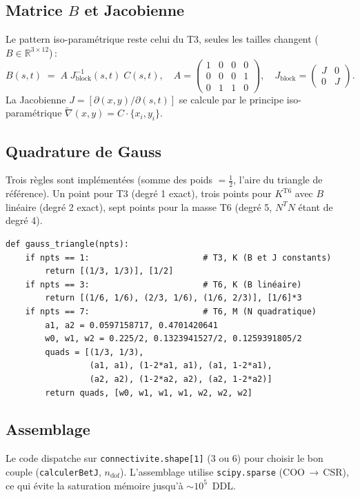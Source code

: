 \documentclass[a4paper,10pt]{article}
\begin{document}
\subsection{Matrice $B$ et Jacobienne}
Le pattern iso-paramétrique reste celui du T3, seules les tailles
changent ($B\in\mathbb{R}^{3\times 12}$)\,:
\begin{equation}
B(s,t) \;=\; A\;J_\text{block}^{-1}(s,t)\;C(s,t),
\quad
A = \begin{pmatrix} 1&0&0&0\\0&0&0&1\\0&1&1&0\end{pmatrix},
\quad
J_\text{block} = \begin{pmatrix} J&0\\0&J\end{pmatrix}.
\end{equation}
La Jacobienne $J=[\partial(x,y)/\partial(s,t)]$ se calcule par le
principe iso-paramétrique $\tilde\nabla(x,y) = C\cdot\{x_i,y_i\}$.

\subsection{Quadrature de Gauss}
Trois règles sont implémentées (somme des poids $= \tfrac12$,
l'aire du triangle de référence). Un point pour T3 (degré 1 exact),
trois points pour $K^\text{T6}$ avec $B$ linéaire (degré 2 exact),
sept points pour la masse T6 (degré 5, $N^TN$ étant de degré 4).

\begin{verbatim}
def gauss_triangle(npts):
    if npts == 1:                       # T3, K (B et J constants)
        return [(1/3, 1/3)], [1/2]
    if npts == 3:                       # T6, K (B linéaire)
        return [(1/6, 1/6), (2/3, 1/6), (1/6, 2/3)], [1/6]*3
    if npts == 7:                       # T6, M (N quadratique)
        a1, a2 = 0.0597158717, 0.4701420641
        w0, w1, w2 = 0.225/2, 0.1323941527/2, 0.1259391805/2
        quads = [(1/3, 1/3),
                 (a1, a1), (1-2*a1, a1), (a1, 1-2*a1),
                 (a2, a2), (1-2*a2, a2), (a2, 1-2*a2)]
        return quads, [w0, w1, w1, w1, w2, w2, w2]
\end{verbatim}

\subsection{Assemblage}
Le code dispatche sur \texttt{connectivite.shape[1]} (3 ou 6) pour
choisir le bon couple (\texttt{calculerBetJ}, $n_\text{dof}$).
L'assemblage utilise \texttt{scipy.sparse} (COO\,$\to$\,CSR), ce qui
évite la saturation mémoire jusqu'à $\sim\!10^5$~DDL.
\end{document}
